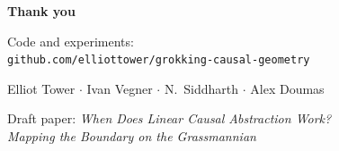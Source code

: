 \documentclass[aspectratio=169,11pt]{beamer}
\begin{document}
\begin{frame}[plain]
\vfill
\begin{center}
{\Large\bfseries Thank you}

\vspace{1em}
{\small Code and experiments:\\
\texttt{github.com/elliottower/grokking-causal-geometry}}

\vspace{0.5em}
{\small Elliot Tower \quad $\cdot$ \quad Ivan Vegner \quad $\cdot$ \quad N.\ Siddharth \quad $\cdot$ \quad Alex Doumas}

\vspace{1em}
{\small \textcolor{neutral}{Draft paper: \emph{When Does Linear Causal Abstraction Work?\\Mapping the Boundary on the Grassmannian}}}
\end{center}
\vfill
\end{frame}
\end{document}
